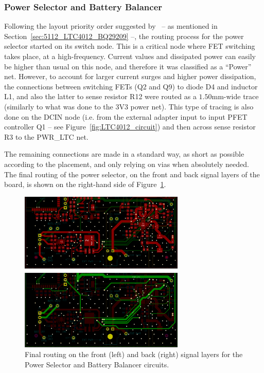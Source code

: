 \subsubsection{Power Selector and Battery Balancer}\label{sec:522_LTC4012_BQ29209}

Following the layout priority order suggested by~\cite{LTC4012} --  as mentioned in Section~\ref{sec:5112_LTC4012_BQ29209} --, the routing process for the power selector started on its switch node. This is a critical node where FET switching takes place, at a high-frequency. Current values and dissipated power can easily be higher than usual on this node, and therefore it was classified as a ``Power'' net. However, to account for larger current surges and higher power dissipation, the connections between switching FETs (Q2 and Q9) to diode D4 and inductor L1, and also the latter to sense resistor R12 were routed as a $1.50$mm-wide trace (similarly to what was done to the 3V3 power net). This type of tracing is also done on the DCIN node (i.e. from the external adapter input to input PFET controller Q1 -- see Figure~\ref{fig:LTC4012_circuit}) and then across sense resistor R3 to the PWR\_LTC net.

The remaining connections are made in a standard way, as short as possible according to the placement, and only relying on vias when absolutely needed. The final routing of the power selector, on the front and back signal layers of the board, is shown on the right-hand side of Figure~\ref{fig:2_routing_LTC4012_BQ29209_FCu_BCu}.

\begin{figure}[h]
	\centering
	\includegraphics[width=0.7\textwidth]{Chapters/Figures/chapter5/2_routing_LTC4012_BQ29209_FCu_BCu.png}
	\caption{Final routing on the front (left) and back (right) signal layers for the Power Selector and Battery Balancer circuits.}
	\label{fig:2_routing_LTC4012_BQ29209_FCu_BCu}
\end{figure}


